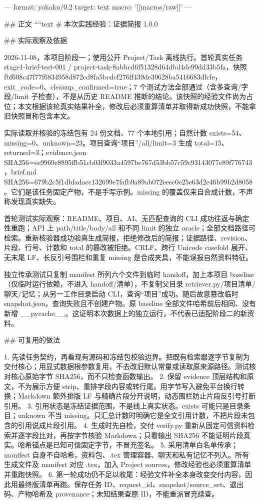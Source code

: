 ---
format: yohaku/0.2
target: text
macro: '[[macros/raw]]'
---

## 正文
````text
# 本次实践经验：证据简报 1.0.0

## 实际观察及依据

2026-11-08，本项目阶段一；使用公开 Project/Task 离线执行。首轮真实任务 stage1-brief-test-001 / project-task-8abbcd6f51328d64dbd4de99dd33b5fa，快照 fbf608c47f77f6834958d872cd8fa5bcdcf276ff439de39628ba5416683dfcfe，exit_code=0、cleanup_confirmed=true；7 个测试方法全部通过（含多查询/字段/limit 子检查），不是从历史 README 推断的结论。该快照的经验文件尚为占位；本文根据该轮真实结果补全，修改后必须重算清单并取得新成功快照，不能拿旧快照冒称包含本文。

实际读取并核验的冻结包有 24 份文档、77 个本地引用；自然计数 exists=54、missing=0、unknown=23。项目查询“项目”/all/limit=3 生成 total=15、returned=3；evidence.json SHA256=ee9969e8895ffb51cb03f9033a4597be767d53bb57c59c93143077e89f776743，brief.md SHA256=679b2c5f1dbfadacc132699e7fafb9a89ab072eeec0e25e63d2e46b99b2d8058。它们是该任务固定产物，不是手写示例。missing 的覆盖仅来自合成计数，不声称发现真实缺失。

首轮测试实际观察：README、项目、AI、无匹配查询的 CLI 成功往返与确定性重跑；API 上 path/title/body/all 和不同 limit 的独立 oracle；全部文档路径可检索。重新核验器成功验真生成简报，拒绝修改后的简报；证据路径、revision、片段、行号、计数和 total 的篡改被拒绝。CRLF、跨行 Unicode casefold 展开、无末尾 LF、长反引号围栏和重复 missing 是合成夹具，不能误报自然资料特征。

独立传承测试只复制 manifest 所列六个文件到临时 handoff，加上本项目 baseline（仅临时运行依赖，不进入 handoff/清单），不复制父目录 retriever.py/项目清单/聊天/记忆；从另一工作目录启动 CLI，查询“项目”成功。随后故意篡改临时 snapshot.json，查询失败且不创建产物。原 baseline 全部文件哈希前后相同、没有新增 __pycache__。这证明本次数据上的独立运行，不代表已适配阶段二的新资料。

## 可复用的做法

1. 先读任务契约，再看现有源码和冻结包校验边界。把既有检索器逐字节复制为交付核心；用显式数据根参数复用，不去改旧默认常量或读取原来源路径。测试核对核心原始字节 SHA256，而不只检查函数输出。
2. 保留 evidence 顶层结构和原文，不为展示方便 strip、重排字段内容或转行尾。用字节写入避免平台换行转换；Markdown 额外排版 LF 与精确片段分开说明，动态围栏防止片段反引号打断引用。
3. 引用状态是冻结证据范围，不是线上真实状态。exists 可能只是目录条目；unknown 不当 missing。只汇总计数时明确它是全文引用计数，不把片段未包含的引用说成片段引用。
4. 生成时先自检，交付 verify.py 重新从固定可信资料检索并逐字段比对，再按字节核验 Markdown；只看输出 SHA256 不能证明片段真实。哈希锚点是已知可信固定字节，不冒充签名。
5. 采用清单白名单传承；manifest 自身不自哈希，资料包、.tex 管理容器、聊天和私有记忆不列入。所有生成文件及 manifest 对应 .tex，加入 Project sources，修改经验也必须重算清单并重跑快照。
6. 第一轮成功仍不足以收尾：经验文件补全本身改变交付内容，因此用最终版清单再跑。保存任务 ID、request_id、snapshot/source_set、退出码、产物哈希及 provenance；未知结果查原 ID，不能重派冒充续查。

